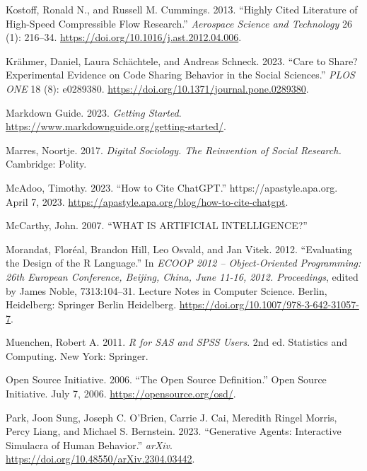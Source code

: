 \documentclass[
  letterpaper,
]{scrbook}
\newlength{\cslhangindent}
\newlength{\cslentryspacingunit} %
\newenvironment{CSLReferences}[2] %
 {%
  \setlength{\parindent}{0pt}
  \ifodd #1
  \let\oldpar\par
  \def\par{\hangindent=\cslhangindent\oldpar}
  \fi
  \setlength{\parskip}{#2\cslentryspacingunit}
 }%
 {}
\begin{document}
\begin{CSLReferences}{1}{0}
\leavevmode{}%
Kostoff, Ronald N., and Russell M. Cummings. 2013. {``Highly Cited
Literature of High-Speed Compressible Flow Research.''} \emph{Aerospace
Science and Technology} 26 (1): 216--34.
\url{https://doi.org/10.1016/j.ast.2012.04.006}.

\leavevmode{}%
Krähmer, Daniel, Laura Schächtele, and Andreas Schneck. 2023. {``Care to
Share? {Experimental} Evidence on Code Sharing Behavior in the Social
Sciences.''} \emph{PLOS ONE} 18 (8): e0289380.
\url{https://doi.org/10.1371/journal.pone.0289380}.

\leavevmode{}%
Markdown Guide. 2023. \emph{Getting {Started}}.
\url{https://www.markdownguide.org/getting-started/}.

\leavevmode{}%
Marres, Noortje. 2017. \emph{Digital {Sociology}. {The Reinvention} of
{Social Research}.} Cambridge: Polity.

\leavevmode{}%
McAdoo, Timothy. 2023. {``How to Cite {ChatGPT}.''}
https://apastyle.apa.org. April 7, 2023.
\url{https://apastyle.apa.org/blog/how-to-cite-chatgpt}.

\leavevmode{}%
McCarthy, John. 2007. {``{WHAT IS ARTIFICIAL INTELLIGENCE}?''}

\leavevmode{}%
Morandat, Floréal, Brandon Hill, Leo Osvald, and Jan Vitek. 2012.
{``Evaluating the {Design} of the {R Language}.''} In \emph{{ECOOP} 2012
-- {Object-Oriented Programming}: 26th {European Conference}, {Beijing},
{China}, {June} 11-16, 2012. {Proceedings}}, edited by James Noble,
7313:104--31. Lecture {Notes} in {Computer Science}. Berlin, Heidelberg:
Springer Berlin Heidelberg.
\url{https://doi.org/10.1007/978-3-642-31057-7}.

\leavevmode{}%
Muenchen, Robert A. 2011. \emph{R for {SAS} and {SPSS} Users}. 2nd ed.
Statistics and Computing. New York: Springer.

\leavevmode{}%
Open Source Initiative. 2006. {``The {Open Source Definition}.''} Open
Source Initiative. July 7, 2006. \url{https://opensource.org/osd/}.

\leavevmode{}%
Park, Joon Sung, Joseph C. O'Brien, Carrie J. Cai, Meredith Ringel
Morris, Percy Liang, and Michael S. Bernstein. 2023. {``Generative
{Agents}: {Interactive Simulacra} of {Human Behavior}.''} \emph{arXiv}.
\url{https://doi.org/10.48550/arXiv.2304.03442}.


\end{CSLReferences}
\end{document}
